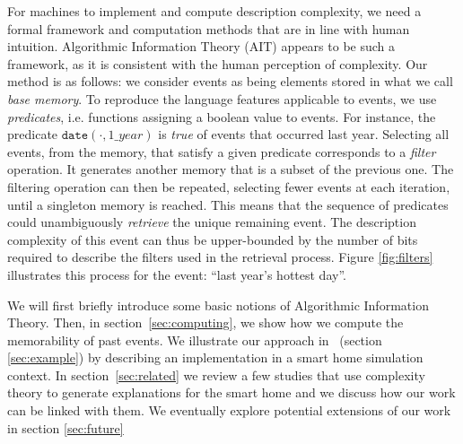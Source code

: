 \documentclass[conference]{IEEEtran}
\begin{document}
For machines to implement and compute description complexity, we need a formal framework and computation methods that are in line with human intuition.  Algorithmic Information Theory (AIT) appears to be such a framework, as it is consistent with the human perception of complexity\cite{li_introduction_2008,dessalles2011coincidences,delahaye_numerical_2012}. Our method is as follows: we
consider events as being elements stored in what we call \emph{base memory}. To
reproduce the language features applicable to events, we use \emph
{predicates}, i.e. functions assigning a boolean value to events. For instance, the predicate $\mathtt{date}
  (\cdot, 1\_year)$ is \emph{true} of events that occurred last year. Selecting
all events, from the memory, that satisfy a given predicate corresponds to
a \emph{filter} operation. It generates another memory that is a subset of the previous one.
The filtering operation can then be repeated, selecting
fewer events at each iteration, until a singleton memory is reached. This means that the sequence
of predicates could unambiguously \emph{retrieve} the unique remaining event.
The description complexity of this event can thus be upper-bounded by the
number of bits required to describe the filters used in the retrieval
process. Figure \ref{fig:filters} illustrates this process for the event: ``last year's hottest day''.




We will first briefly introduce
some basic notions of Algorithmic Information Theory. Then, in
section~\ref{sec:computing}, we show how we compute the
memorability of past events. We illustrate our approach in~
(section \ref{sec:example}) by describing an implementation
in a smart home simulation context. In section~\ref{sec:related} we review
a few studies that use complexity theory to generate explanations for the smart home
and we discuss how our work can be linked with them. We eventually explore potential
extensions of our work in section \ref{sec:future}
\end{document}
